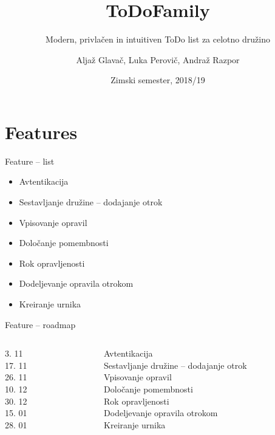 \documentclass[10pt]{beamer}
\title{ToDoFamily}
\subtitle{Modern, privlačen in intuitiven ToDo list za celotno družino}
\date{Zimski semester, 2018/19}
\author{Aljaž Glavač, Luka Perovič, Andraž Razpor}
\institute{Univerza v Ljubljani, Fakulteta za računalništvo in informatiko}
\begin{document}
\maketitle


\section{Features}

\begin{frame}{Feature -- list}
    \begin{itemize}
        \item Avtentikacija
        \item Sestavljanje družine -- dodajanje otrok
        \item Vpisovanje opravil
        \item Določanje pomembnosti 
        \item Rok opravljenosti
        \item Dodeljevanje opravila otrokom
        \item Kreiranje urnika
    \end{itemize}
\end{frame}

\begin{frame}{Feature -- roadmap}
\begin{columns}[c]
    \begin{column}{0.1\textwidth}
        \hfill 3. 11 \\
        \hfill 17. 11 \\
        \hfill 26. 11 \\
        \hfill 10. 12 \\
        \hfill 30. 12 \\
        \hfill 15. 01 \\
        \hfill 28. 01 \\
    \end{column}
    \hspace{-15pt}\vrule\hspace{5pt}%
    \begin{column}{0.9\textwidth}  %
            Avtentikacija \\
            Sestavljanje družine -- dodajanje otrok \\
            Vpisovanje opravil \\
            Določanje pomembnosti \\
            Rok opravljenosti \\
            Dodeljevanje opravila otrokom \\
            Kreiranje urnika \\
    \end{column}
\end{columns}
\end{frame}
\end{document}
